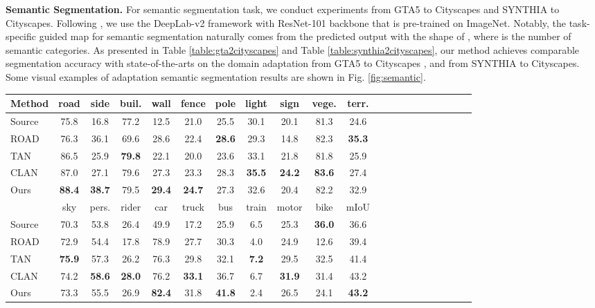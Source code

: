 \documentclass[runningheads]{llncs}
\begin{document}
\noindent \textbf{Semantic Segmentation.}
For semantic segmentation task, we conduct experiments from GTA5 \cite{DBLP:conf/eccv/RichterVRK16} to Cityscapes \cite{DBLP:conf/cvpr/CordtsORREBFRS16} and SYNTHIA \cite{DBLP:conf/cvpr/RosSMVL16} to Cityscapes. Following \cite{DBLP:conf/cvpr/Luo0GYY19}, we use the DeepLab-v2 \cite{DBLP:journals/pami/ChenPKMY18} framework with ResNet-101 backbone that is pre-trained on ImageNet. Notably, the task-specific guided map for semantic segmentation naturally comes from the predicted output with the shape of , where  is the number of semantic categories. As presented in Table \ref{table:gta2cityscapes} and Table \ref{table:synthia2cityscapes}, our method achieves comparable segmentation accuracy with state-of-the-arts on the domain adaptation from GTA5 \cite{DBLP:conf/eccv/RichterVRK16} to Cityscapes \cite{DBLP:conf/cvpr/CordtsORREBFRS16}, and from SYNTHIA \cite{DBLP:conf/cvpr/RosSMVL16} to Cityscapes. Some visual examples of adaptation semantic segmentation results are shown in Fig. \ref{fig:semantic}.
\begin{table*}[t]
\centering
\caption{Adaptation semantic segmentation results from GTA5 to Cityscapes.}
\setlength{\tabcolsep}{3.0pt}
\begin{tabular}{l|ccccccccccccccccccc|c}
\hline
Method & road &side &buil. &wall &fence &pole &light &sign &vege. &terr. \\
\hline
Source &75.8 &16.8 &77.2 &12.5 &21.0 &25.5 &30.1 &20.1 &81.3 &24.6  \\
ROAD \cite{DBLP:conf/cvpr/Chen0G18} &76.3 &36.1 &69.6 &28.6 &22.4 &\bf28.6 &29.3 &14.8 &82.3 &\bf35.3 \\
TAN \cite{DBLP:conf/cvpr/TsaiHSS0C18} &86.5 &25.9 &\bf79.8 &22.1 &20.0 &23.6 &33.1 &21.8 &81.8 &25.9  \\
CLAN \cite{DBLP:conf/cvpr/Luo0GYY19} &87.0 &27.1 &79.6 &27.3 &23.3 &28.3 &\bf35.5 &\bf24.2 &\bf83.6 &27.4  \\
Ours &{\bf 88.4} &{\bf 38.7} &79.5 &{\bf 29.4} &{\bf 24.7} &27.3 & 32.6& 20.4 &82.2 &32.9 \\
\hline
\hline
&sky  &pers. &rider &car &truck &bus &train &motor &bike &mIoU \\
Source &70.3 &53.8 &26.4 &49.9 &17.2 &25.9 &6.5 &25.3 &\bf36.0 &36.6 \\
ROAD \cite{DBLP:conf/cvpr/Chen0G18} &72.9 &54.4 &17.8 &78.9 &27.7 &30.3 &4.0 &24.9 &12.6 &39.4 \\
TAN \cite{DBLP:conf/cvpr/TsaiHSS0C18} &\bf75.9 &57.3 &26.2 &76.3 &29.8 &32.1 &\bf7.2 &29.5 &32.5 &41.4 \\
CLAN \cite{DBLP:conf/cvpr/Luo0GYY19} &74.2 &\bf58.6 &\bf28.0 &76.2 &\bf33.1 &36.7 &6.7 &\bf31.9 &31.4 &43.2 \\
Ours &73.3 &55.5 &26.9 &{\bf 82.4} &31.8 &{\bf 41.8} &2.4 &26.5 &24.1 &{\bf 43.2} \\
\hline
\end{tabular}
\label{table:gta2cityscapes}
\end{table*}
\end{document}
